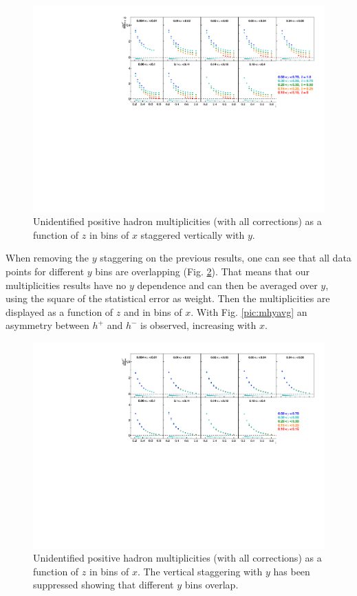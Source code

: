 \begin{figure}[!h]
  \centering
	\includegraphics[scale=0.85]{./gfx/hm.pdf}
	\caption{Unidentified positive hadron multiplicities (with all corrections) as a function of $z$ in bins of $x$ staggered vertically with $y$.}
	\label{pic:mhm}
\end{figure}

When removing the $y$ staggering on the previous results, one can see that all data points for different $y$ bins are overlapping (Fig. \ref{pic:mhnoy}). That means that our multiplicities results have no $y$ dependence and can then be averaged over $y$, using the square of the statistical error as weight. Then the multiplicities are displayed as a function of $z$ and in bins of $x$. With Fig. \ref{pic:mhyavg} an asymmetry between $h^+$ and $h^-$ is observed, increasing with $x$.

\begin{figure}[!h]
  \centering
	\includegraphics[scale=0.85]{./gfx/hnoystag.pdf}
	\caption{Unidentified positive hadron multiplicities (with all corrections) as a function of $z$ in bins of $x$. The vertical staggering with $y$ has been suppressed showing that different $y$ bins overlap.}
	\label{pic:mhnoy}
\end{figure}

